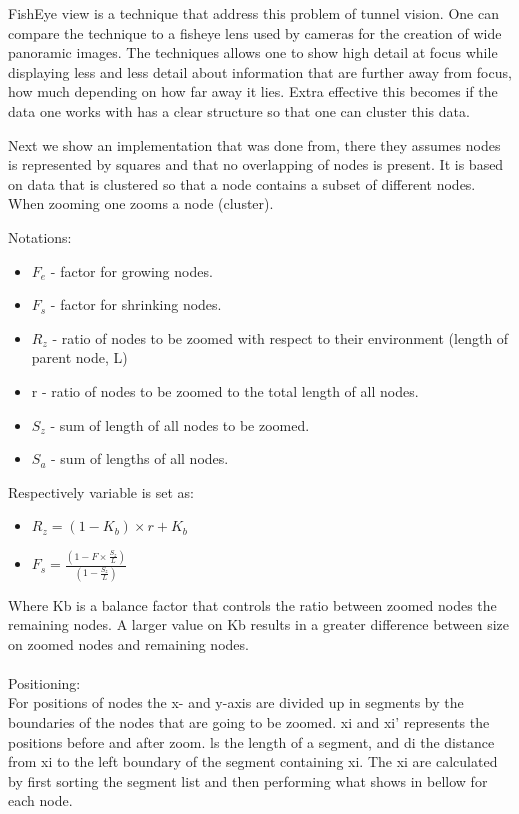 \documentclass[a4paper,11pt]{kth-mag}
\begin{document}
FishEye view is a technique that address this problem of tunnel vision. One can compare the technique to a fisheye lens used by cameras for the creation of wide panoramic images. The techniques allows one to show high detail
at focus while displaying less and less detail about information that are further away from focus, how much depending on how far away it lies. Extra effective this becomes if the data one works with has a clear structure so
that one can cluster this data.

Next we show an implementation that was done from\cite{Schaffer:1996:NHC:230562.230577}, there they assumes nodes is represented by squares and that no overlapping of nodes is present. It is based
on data that is clustered so that a node contains a subset of different nodes. When zooming one zooms a node (cluster).

Notations:
\begin{itemize}
	\item $F_e$ - factor for growing nodes.
	\item $F_s$ - factor for shrinking nodes.
	\item $R_z$ - ratio of nodes to be zoomed with respect to their environment (length of parent node, L)
	\item r - ratio of nodes to be zoomed to the total length of all nodes.
	\item $S_z$ - sum of length of all nodes to be zoomed.
	\item $S_a$ - sum of lengths of all nodes.
\end{itemize}
Respectively variable is set as:
\begin{itemize}
	\item $R_z=(1-K_b)\times r + K_b$
	\item $F_s=\frac{(1-F\times \frac{S_z}{L})}{(1-\frac{S_z}{L})}$
\end{itemize}
Where Kb is a balance factor that controls the ratio between zoomed nodes the remaining nodes. A larger value
on Kb results in a greater difference between size on zoomed nodes and remaining nodes.\\
\\
Positioning:\\
For positions of nodes the x- and y-axis are divided up in segments by the boundaries of the nodes that are going to be zoomed. xi and xi'
represents the positions before and after zoom. ls the length of a segment, and di the distance from xi to the left boundary of the segment
containing xi. The xi are calculated by first sorting the segment list and then performing what shows in bellow for each node.
\end{document}
